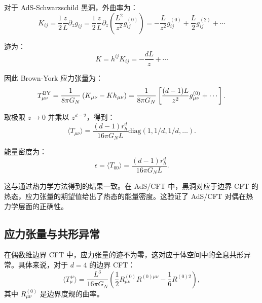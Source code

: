 \begin{example}[全息应力张量的计算]
对于 AdS-Schwarzschild 黑洞，外曲率为：
\begin{equation}
    K_{ij} = \frac{1}{2} \frac{z}{L} \partial_z g_{ij} = \frac{1}{2} \frac{z}{L} \partial_z \left(\frac{L^2}{z^2} g_{ij}^{(0)}\right) = -\frac{L}{z^2} g_{ij}^{(0)} + \frac{L}{2} g_{ij}^{(2)} + \cdots
\end{equation}

迹为：
\begin{equation}
    K = h^{ij} K_{ij} = -\frac{d L}{z} + \cdots
\end{equation}

因此 Brown-York 应力张量为：
\begin{equation}
    T^{\rm BY}_{\mu\nu} = \frac{1}{8\pi G_N} \left(K_{\mu\nu} - K h_{\mu\nu}\right) = \frac{1}{8\pi G_N} \left[\frac{(d-1) L}{z^2} g_{\mu\nu}^{(0)} + \cdots\right].
\end{equation}

取极限 $z \to 0$ 并乘以 $z^{d-2}$，得到：
\begin{equation}
    \langle T_{\mu\nu} \rangle = \frac{(d-1) r_h^d}{16\pi G_N L} \text{diag}(1, 1/d, 1/d, \ldots).
\end{equation}
\end{example}

能量密度为：
\begin{equation}
    \epsilon = \langle T_{00} \rangle = \frac{(d-1) r_h^d}{16\pi G_N L}.
\end{equation}

\begin{note}[与热力学的一致性]
这与通过热力学方法得到的结果一致\cite{Balasubramanian1999}。在 AdS/CFT 中，黑洞对应于边界 CFT 的热态，应力张量的期望值给出了热态的能量密度。这验证了 AdS/CFT 对偶在热力学层面的正确性。
\end{note}

\subsection{应力张量与共形异常}

在偶数维边界 CFT 中，应力张量的迹不为零，这对应于体空间中的全息共形异常\cite{Henningson1998}。具体来说，对于 $d=4$ 的边界 CFT：
\begin{equation}
    \langle T_\mu^{~\mu} \rangle = \frac{L^3}{16\pi G_N} \left(\frac{1}{2} R_{\mu\nu}^{(0)} R^{(0)\mu\nu} - \frac{1}{6} R^{(0)2}\right),
\end{equation}
其中 $R_{\mu\nu}^{(0)}$ 是边界度规的曲率。

